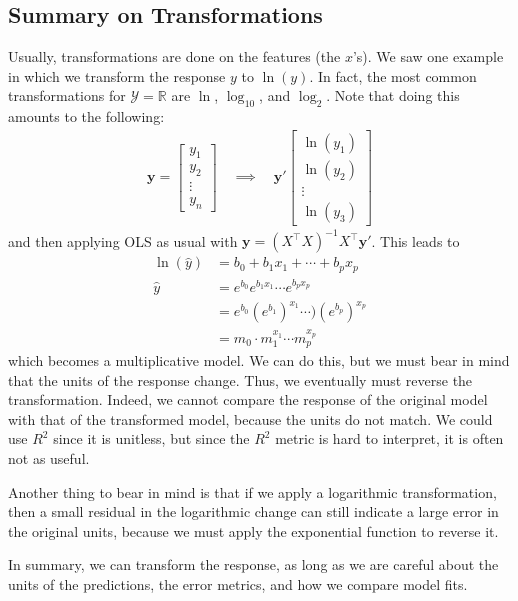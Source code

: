\documentclass[12pt, a4paper]{article}
\theoremstyle{definition}
\begin{document}
	\subsection*{Summary on Transformations}
	Usually, transformations are done on the features (the $x$'s). We saw one example
	in which we transform the response $y$ to $\ln(y)$. In fact, the
	most common transformations for $\mathcal{Y}=\mathbb{R}$ are $\ln$,
	$\log_{10}$, and $\log_{2}$. Note that doing this amounts to the following:
	\begin{align*}
		\bm{y} = \begin{bmatrix}
			y_1\\
			y_2\\
			\vdots\\
			y_n
		\end{bmatrix}
		\quad
		\implies
		\quad
		\bm{y}'
		\begin{bmatrix}
			\ln(y_1)\\
			\ln(y_2)\\
			\vdots\\
			\ln(y_3)
		\end{bmatrix}
	\end{align*}
	and then applying OLS as usual with $\bm{y} = (X^\top X)^{-1}X^\top \bm{y}'$.
	This leads to
	\begin{align*}
		\ln(\hat{y})
		&= b_0 + b_1 x_1 + \cdots + b_px_p\\
		\hat{y} &= e^{b_0} e^{b_1x_1}\cdots e^{b_px_p}\\
		&=e^{b_0}(e^{b_1})^{x_1}\cdots )(e^{b_p})^{x_p}\\
		&=m_0\cdot m_1^{x_1}\cdots m_p^{x_p}
	\end{align*}
	which becomes a multiplicative model. We can do this, but we must bear in mind
	that the units of the response change. Thus, we eventually must reverse the
	transformation. Indeed, we cannot compare the response of the original model with
	that of the transformed model, because the units do not match. We could use $R^2$
	since it is unitless, but since the $R^2$ metric is hard to interpret, it
	is often not as useful.
	
	Another thing to bear in mind is that if we apply a logarithmic transformation,
	then a small residual in the logarithmic change can still indicate a large error in
	the original units, because we must apply the exponential function to reverse
	it.
	
	In summary, we can transform the response, as long as we are careful about the units
	of the predictions, the error metrics, and how we compare model fits.
	
\end{document}

